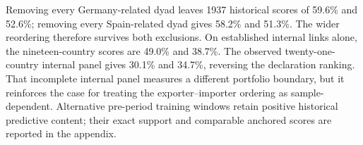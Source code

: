 Removing every Germany-related dyad leaves 1937 historical scores of 59.6\% and 52.6\%; removing every Spain-related dyad gives 58.2\% and 51.3\%. The wider reordering therefore survives both exclusions. On established internal links alone, the nineteen-country scores are 49.0\% and 38.7\%. The observed twenty-one-country internal panel gives 30.1\% and 34.7\%, reversing the declaration ranking. That incomplete internal panel measures a different portfolio boundary, but it reinforces the case for treating the exporter--importer ordering as sample-dependent. Alternative pre-period training windows retain positive historical predictive content; their exact support and comparable anchored scores are reported in the appendix.
